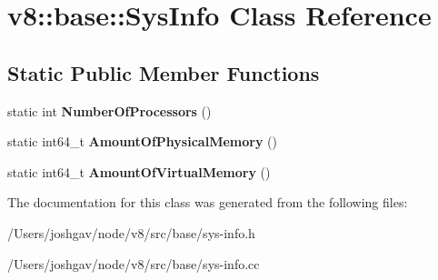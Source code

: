 \hypertarget{classv8_1_1base_1_1_sys_info}{}\section{v8\+:\+:base\+:\+:Sys\+Info Class Reference}
\label{classv8_1_1base_1_1_sys_info}
\subsection*{Static Public Member Functions}
\begin{DoxyCompactItemize}
\item 
static int {\bfseries Number\+Of\+Processors} ()\hypertarget{classv8_1_1base_1_1_sys_info_a2b76071a9327082114103db3a2717630}{}\label{classv8_1_1base_1_1_sys_info_a2b76071a9327082114103db3a2717630}

\item 
static int64\+\_\+t {\bfseries Amount\+Of\+Physical\+Memory} ()\hypertarget{classv8_1_1base_1_1_sys_info_a97f971a5174d8cb9ec1bc9b42b77a893}{}\label{classv8_1_1base_1_1_sys_info_a97f971a5174d8cb9ec1bc9b42b77a893}

\item 
static int64\+\_\+t {\bfseries Amount\+Of\+Virtual\+Memory} ()\hypertarget{classv8_1_1base_1_1_sys_info_af9f658e742009f9c9205088afb6d5c18}{}\label{classv8_1_1base_1_1_sys_info_af9f658e742009f9c9205088afb6d5c18}

\end{DoxyCompactItemize}


The documentation for this class was generated from the following files\+:\begin{DoxyCompactItemize}
\item 
/\+Users/joshgav/node/v8/src/base/sys-\/info.\+h\item 
/\+Users/joshgav/node/v8/src/base/sys-\/info.\+cc\end{DoxyCompactItemize}
